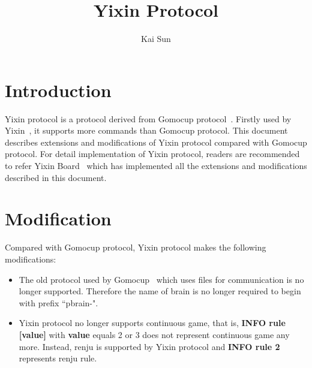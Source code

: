 \documentclass[a4paper,12pt]{article}
\begin{document}
\newtheorem{theorem}{Theorem}[section]
\newtheorem{lemma}{Lemma}[section]
\newtheorem{definition}{Definition}[section]
\newtheorem*{myproof}{Proof}
\newtheorem*{myexercise}{Exercise}
\newtheorem*{myproblem}{Problem}
\author{Kai Sun}
\title{Yixin Protocol}
\maketitle

\section{Introduction}
Yixin protocol is a protocol derived from Gomocup protocol~\cite{gomocup-protocol}. Firstly used by Yixin~\cite{yixin}, it supports more commands than Gomocup protocol. This document describes extensions and modifications of Yixin protocol compared with Gomocup protocol. For detail implementation of Yixin protocol, readers are recommended to refer Yixin Board~\cite{yixin-board} which has implemented all the extensions and modifications described in this document.

\section{Modification}
Compared with Gomocup protocol, Yixin protocol makes the following modifications:
\begin{itemize}
\item The old protocol used by Gomocup~\cite{old-gomocup-protocol} which uses files for communication is no longer supported. Therefore the name of brain is no longer required to begin with prefix ``pbrain-".
\item Yixin protocol no longer supports continuous game, that is, \textbf{INFO rule [value]} with \textbf{value} equals 2 or 3 does not represent continuous game any more. Instead, renju is supported by Yixin protocol and \textbf{INFO rule 2} represents renju rule.
\end{itemize}
\end{document}
